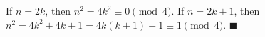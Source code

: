 If $n=2k$, then $n^2=4k^2\equiv0\pmod4$. If $n=2k+1$, then $n^2=4k^2+4k+1=4k(k+1)+1\equiv1\pmod4$. $\blacksquare$
